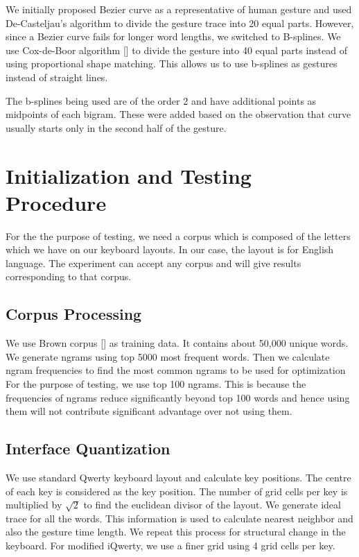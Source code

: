 \documentclass[MTech]{iitmdiss}
\begin{document}
We initially proposed Bezier curve as a representative of human gesture and used De-Casteljau's algorithm to divide the gesture trace into 20 equal parts. However, since a Bezier curve fails for longer word lengths, we switched to B-splines.
We use Cox-de-Boor algorithm [\cite{deboor}] to divide the gesture into 40 equal parts instead of using proportional shape matching. This allows us to use b-splines as gestures instead of straight lines.

The b-splines being used are of the order 2 and have additional points as midpoints of each bigram. These were added based on the observation that curve usually starts only in the second half of the gesture.

\chapter{Initialization and Testing Procedure}
For the the purpose of testing, we need a corpus which is composed of the letters which we have on our keyboard layouts. In our case, the layout is for English language. The experiment can accept any corpus and will give results corresponding to that corpus.

\section{Corpus Processing}
We use Brown corpus [\cite{brown}] as training data. It contains about 50,000 unique words.
We generate ngrams using top 5000 most frequent words.
Then we calculate ngram frequencies to find the most common ngrams to be used for optimization For the purpose of testing, we use top 100 ngrams. This is because the frequencies of ngrams reduce significantly beyond top 100 words and hence using them will not contribute significant advantage over not using them.

\section{Interface Quantization}
We use standard Qwerty keyboard layout and calculate key positions.
The centre of each key is considered as the key position.
The number of grid cells per key is multiplied by $\sqrt{2}$ to find the euclidean divisor of the layout.
We generate ideal trace for all the words. 
This information is used to calculate nearest neighbor and also the gesture time length.
We repeat this process for structural change in the keyboard. For modified iQwerty, we use a finer grid using 4 grid cells per key.
\end{document}
